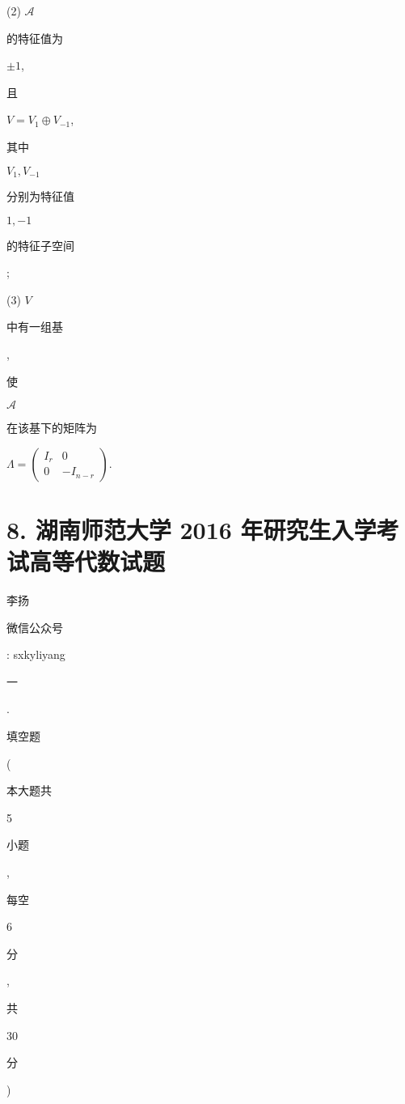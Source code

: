 \documentclass[10pt]{article}
\begin{document}
(2) $\mathscr{A}$ \begin{CJK}{UTF8}{mj}的特征值为\end{CJK} $\pm 1$, \begin{CJK}{UTF8}{mj}且\end{CJK} $V=V_{1} \oplus V_{-1}$, \begin{CJK}{UTF8}{mj}其中\end{CJK} $V_{1}, V_{-1}$ \begin{CJK}{UTF8}{mj}分别为特征值\end{CJK} $1,-1$ \begin{CJK}{UTF8}{mj}的特征子空间\end{CJK};

(3) $V$ \begin{CJK}{UTF8}{mj}中有一组基\end{CJK}, \begin{CJK}{UTF8}{mj}使\end{CJK} $\mathscr{A}$ \begin{CJK}{UTF8}{mj}在该基下的矩阵为\end{CJK} $\Lambda=\left(\begin{array}{cc}I_{r} & 0 \\ 0 & -I_{n-r}\end{array}\right)$.

\section{8. 湖南师范大学 2016 年研究生入学考试高等代数试题}
\begin{CJK}{UTF8}{mj}李扬\end{CJK}

\begin{CJK}{UTF8}{mj}微信公众号\end{CJK}: sxkyliyang

\begin{CJK}{UTF8}{mj}一\end{CJK}. \begin{CJK}{UTF8}{mj}填空题\end{CJK} (\begin{CJK}{UTF8}{mj}本大题共\end{CJK} 5 \begin{CJK}{UTF8}{mj}小题\end{CJK}, \begin{CJK}{UTF8}{mj}每空\end{CJK} 6 \begin{CJK}{UTF8}{mj}分\end{CJK}, \begin{CJK}{UTF8}{mj}共\end{CJK} 30 \begin{CJK}{UTF8}{mj}分\end{CJK})
\end{document}
